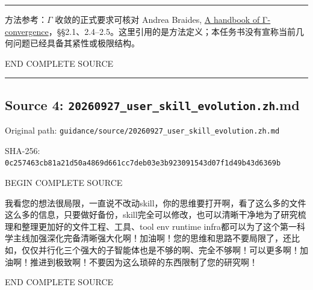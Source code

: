 \documentclass[
  10pt,
]{article}
\begin{document}
\begin{center}\rule{0.5\linewidth}{0.5pt}\end{center}

方法参考：\(\Gamma\) 收敛的正式要求可核对 Andrea Braides,
\href{https://cvgmt.sns.it/media/doc/paper/57/Handbook.pdf}{A handbook
of
Γ-convergence}，§§2.1、2.4--2.5。这里引用的是方法定义；本任务书没有宣称当前几何问题已经具备其紧性或极限结构。

END COMPLETE SOURCE

\begin{center}\rule{0.5\linewidth}{0.5pt}\end{center}

\hypertarget{source-4-20260927_user_skill_evolution.zh.md}{%
\subsection{Source 4:
\nolinkurl{20260927_user_skill_evolution.zh}.md}\label{source-4-20260927_user_skill_evolution.zh.md}}

Original path:
\nolinkurl{guidance/source/20260927_user_skill_evolution.zh.md}

SHA-256:
\nolinkurl{0c257463cb81a21d50a4869d661cc7deb03e3b923091543d07f1d49b43d6369b}

BEGIN COMPLETE SOURCE

我看您的想法很局限，一直说不改动skill，你的思维要打开啊，看了这么多的文件这么多的信息，只要做好备份，skill完全可以修改，也可以清晰干净地为了研究梳理和整理更加好的文件工程、工具、tool
env runtime
infra都可以为了这个第一科学主线加强深化完备清晰强大化啊！加油啊！您的思维和思路不要局限了，还比如，仅仅并行化三个强大的子智能体也是不够的啊、完全不够啊！可以更多啊！加油啊！推进到极致啊！不要因为这么琐碎的东西限制了您的研究啊！

END COMPLETE SOURCE
\end{document}
